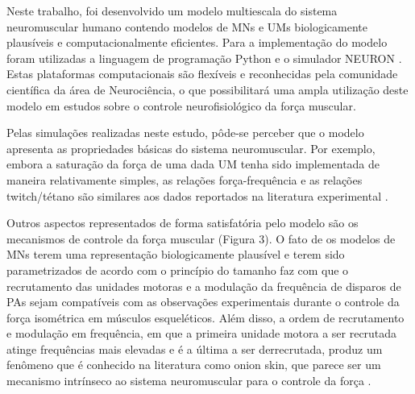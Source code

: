 Neste trabalho, foi desenvolvido um modelo multiescala do sistema neuromuscular humano contendo modelos de MNs e UMs biologicamente plausíveis e computacionalmente eficientes. Para a implementação do modelo foram utilizadas a linguagem de programação Python e o simulador NEURON \cite{carnevale2006neuron}. Estas plataformas computacionais são flexíveis e reconhecidas pela comunidade científica da área de Neurociência, o que possibilitará uma ampla utilização deste modelo em estudos sobre o controle neurofisiológico da força muscular.

Pelas simulações realizadas neste estudo, pôde-se perceber que o modelo apresenta as propriedades básicas do sistema neuromuscular. Por exemplo, embora a saturação da força de uma dada UM tenha sido implementada de maneira relativamente simples, as relações força-frequência e as relações twitch/tétano são similares aos dados reportados na literatura experimental \cite{Kernell2006}.

Outros aspectos representados de forma satisfatória pelo modelo são os mecanismos de controle da força muscular (Figura 3). O fato de os modelos de MNs terem uma representação biologicamente plausível e terem sido parametrizados de acordo com o princípio do tamanho \cite{HENNEMAN1957} faz com que o recrutamento das unidades motoras e a modulação da frequência de disparos de PAs sejam compatíveis com as observações experimentais durante o controle da força isométrica em músculos esqueléticos. Além disso, a ordem de recrutamento e modulação em frequência, em que a primeira unidade motora a ser recrutada atinge frequências mais elevadas e é a última a ser derrecrutada, produz um fenômeno que é conhecido na literatura como onion skin, que parece ser um mecanismo intrínseco ao sistema neuromuscular para o controle da força \cite{DeLuca2015}.